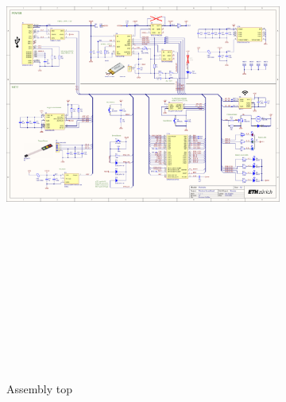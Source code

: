 \begin{figure}[H]
\begin{subfigure}{0.24\textwidth}
{\includegraphics[height=17.5cm, page=3]{../../5_Hardware/WSBR_Board/Project Outputs for WSBR_Board/WSBR_Board.PDF}}
\caption{Assembly top}
\end{subfigure}
\begin{subfigure}{0.24\textwidth}
\framebox{
}
\end{subfigure}
\end{figure}
